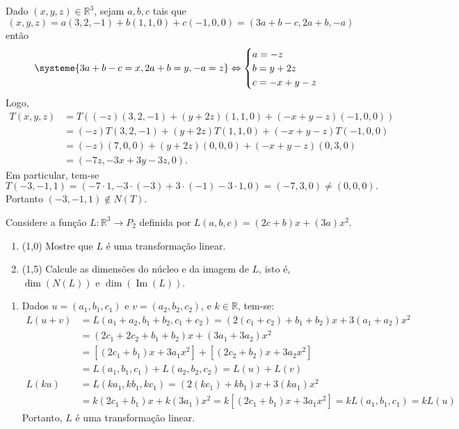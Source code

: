 \documentclass[12pt,a4paper]{article}
\newcommand*\im[1]{\operatorname{Im}\left(#1\right)}
\newcommand*\R{\mathbb{R}}
\begin{document}
\begin{ExerciseList}
\Answer Dado $(x,y,z) \in \R^3$, sejam $a,b,c$ tais que
\[
(x,y,z) = a(3,2,-1) + b(1,1,0) + c(-1,0,0) = (3a+b-c,2a+b,-a)
\]
então
\[
\systeme{
3a+b-c = x,
2a+b = y,
-a = z
}
\Leftrightarrow
\begin{cases}
a=-z\\
b=y+2z\\
c=-x+y-z
\end{cases}
\]
Logo,
\begin{align*}
T(x,y,z)
& = T( (-z)(3,2,-1) + (y+2z)(1,1,0) + (-x+y-z)(-1,0,0) )\\
& = (-z)T(3,2,-1) + (y+2z)T(1,1,0) + (-x+y-z)T(-1,0,0)\\
& = (-z)(7,0,0) + (y+2z)(0,0,0) + (-x+y-z)(0,3,0)\\
& = (-7z,-3x+3y-3z,0).
\end{align*}
Em particular, tem-se
\[
T(-3,-1,1)
= (-7 \cdot 1,-3 \cdot (-3)+3 \cdot(-1)-3 \cdot 1,0)
= (-7,3,0)
\neq (0,0,0).
\] Portanto $(-3,-1,1) \not \in N(T)$.


\Exercise[title={2,5}] Considere a função $L: \R^3 \to P_2$ definida por $L(a,b,c) = (2c+b)x + (3a)x^2$.
\begin{enumerate}
\item (1,0) Mostre que $L$ é uma transformação linear.
\item (1,5) Calcule as dimensões do núcleo e da imagem de $L$, isto é, $\dim(N(L))$ e $\dim(\im{L})$.
\end{enumerate}
\Answer
\begin{enumerate}
\item Dados $u = (a_1,b_1,c_1)$ e $v = (a_2,b_2,c_2)$, e $k \in \R$, tem-se:
\begin{align*}
L(u+v)
& = L(a_1+a_2, b_1+b_2, c_1+c_2)
  = (2(c_1+c_2)+b_1+b_2)x + 3(a_1+a_2)x^2\\
& = (2c_1+2c_2+b_1+b_2)x + (3a_1+3a_2)x^2\\
& = \left[(2c_1+b_1)x + 3a_1x^2\right] + \left[(2c_2+b_2)x + 3a_2x^2\right]\\
& = L(a_1, b_1, c_1) + L(a_2, b_2, c_2)
  = L(u) + L(v)\\
L(ku)
& = L(ka_1, kb_1, kc_1)
  = (2(kc_1)+kb_1)x + 3(ka_1)x^2\\
& = k(2c_1+b_1)x + k(3a_1)x^2
  = k\left[(2c_1+b_1)x + 3a_1x^2\right]
  = kL(a_1, b_1, c_1)
  = kL(u)
\end{align*}
Portanto, $L$ é uma transformação linear.


\end{enumerate}
\end{ExerciseList}
\end{document}
